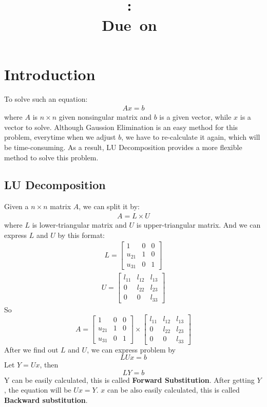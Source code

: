 \documentclass{article}
\title{
    \vspace{2in}
    \textmd{\textbf{\hmwkClass:\ \hmwkTitle}}\\
    \normalsize\vspace{0.1in}\small{Due\ on\ \hmwkDueDate}\\
    \vspace{3in}
}
\author{\textbf{\hmwkAuthorName}}
\date{} %
\begin{document}
\maketitle
\newpage

\section{Introduction}
To solve such an equation:
\begin{gather}
    Ax = b
\end{gather}
where $A$ is $n \times n$ given nonsingular matrix and $b$ is a given vector, while $x$ is a vector to solve. Although Gaussion 
Elimination is an easy method for this problem, everytime when we adjust $b$, we have to re-calculate it again, which will be 
time-consuming. As a result, LU Decomposition provides a more flexible method to solve this problem.

\subsection{LU Decomposition}
Given a $n \times n$ matrix $A$, we can split it by:
\begin{gather}
    A = L \times U
\end{gather}
where $L$ is lower-triangular matrix and $U$ is upper-triangular matrix. And we can express $L$ and $U$ by this format:
\begin{gather}
    L = 
    \begin{bmatrix}
        1 & 0 & 0 \\
        u_{21}  & 1 & 0 \\
        u_{31}  & 0 & 1
    \end{bmatrix} 
\end{gather}
\begin{gather}
    U = 
    \begin{bmatrix}
        l_{11} & l_{12} & l_{13} \\
        0 & l_{22} & l_{23} \\
        0 & 0 & l_{33}
    \end{bmatrix} 
\end{gather}
So
\[
    A =
    \begin{bmatrix}
        1 & 0 & 0 \\
        u_{21}  & 1 & 0 \\
        u_{31}  & 0 & 1
    \end{bmatrix} 
    \times
    \begin{bmatrix}
        l_{11} & l_{12} & l_{13} \\
        0 & l_{22} & l_{23} \\
        0 & 0 & l_{33}
    \end{bmatrix} 
\]
After we find out $L$ and $U$, we can express problem by 
$$
    LUx = b
$$
Let $Y = Ux$, then
$$
    LY = b
$$
Y can be easily calculated, this is called \textbf{Forward Substitution}. After getting $Y$, the equation will be $Ux = Y$. $x$ can be
also easily calculated, this is called \textbf{Backward substitution}.
\end{document}
